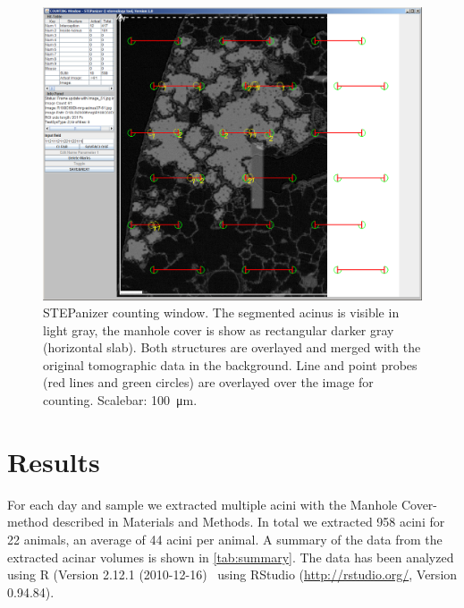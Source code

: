 \documentclass[%
	paper=a4,%
	abstract=true,%
	]{scrartcl}
\newcommand{\imsize}{\linewidth}
\begin{document}
\renewcommand{\imsize}{\linewidth}
\begin{figure}
	\centering
	\includegraphics[width=\imsize]{img/CountingWindowSTEPanizer}
	\caption{STEPanizer counting window. The segmented acinus is visible in light gray, the manhole cover is show as rectangular darker gray (horizontal slab). Both structures are overlayed and merged with the original tomographic data in the background. Line and point probes (red lines and green circles) are overlayed over the image for counting. Scalebar: \SI{100}{\micro\meter}.}
	\label{fig:STEPanizer}
\end{figure}

\section{Results\label{sec:Results}}
For each day and sample we extracted multiple acini with the Manhole Cover-method described in Materials and Methods. In total we extracted 958 acini for 22 animals, an average of 44 acini per animal. A summary of the data from the extracted acinar volumes is shown in \autoref{tab:summary}. The data has been analyzed using R (Version 2.12.1 (2010-12-16)~\cite{R} using RStudio (\url{http://rstudio.org/}, Version 0.94.84).
\end{document}
